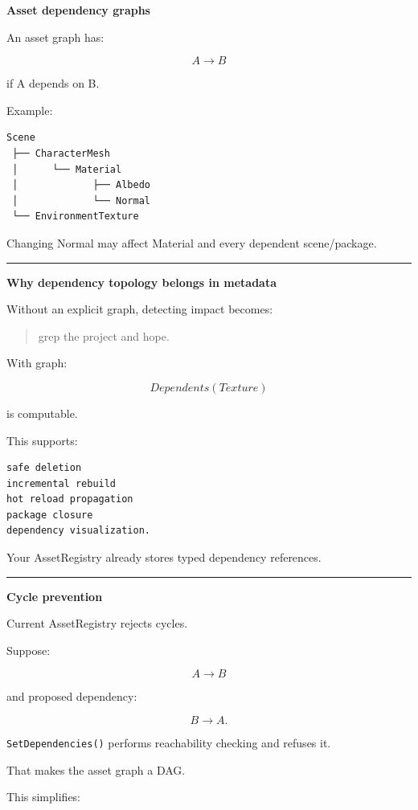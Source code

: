 \textbf{Asset dependency graphs}

An asset graph has:

\[
A\rightarrow B
\]

if A depends on B.

Example:

\begin{verbatim}
Scene
 ├── CharacterMesh
 │      └── Material
 │             ├── Albedo
 │             └── Normal
 └── EnvironmentTexture
\end{verbatim}

Changing Normal may affect Material and every dependent scene/package.

\begin{center}\rule{0.5\linewidth}{0.5pt}\end{center}

\textbf{Why dependency topology belongs in metadata}

Without an explicit graph, detecting impact becomes:

\begin{quote}
grep the project and hope.
\end{quote}

With graph:

\[
Dependents(Texture)
\]

is computable.

This supports:

\begin{verbatim}
safe deletion
incremental rebuild
hot reload propagation
package closure
dependency visualization.
\end{verbatim}

Your AssetRegistry already stores typed dependency references.

\begin{center}\rule{0.5\linewidth}{0.5pt}\end{center}

\textbf{Cycle prevention}

Current AssetRegistry rejects cycles.

Suppose:

\[
A\rightarrow B
\]

and proposed dependency:

\[
B\rightarrow A.
\]

\texttt{SetDependencies()} performs reachability checking and refuses it.

That makes the asset graph a DAG.

This simplifies:


